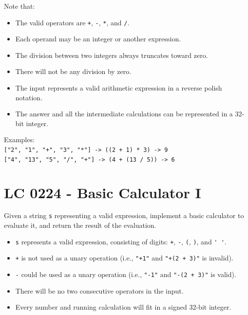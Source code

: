 Note that:
\begin{itemize}
	\item The valid operators are {\colorbox{CodeBackground}{\lstinline|+|}}, {\colorbox{CodeBackground}{\lstinline|-|}}, {\colorbox{CodeBackground}{\lstinline|*|}}, and {\colorbox{CodeBackground}{\lstinline|/|}}.
	\item Each operand may be an integer or another expression.
	\item The division between two integers always truncates toward zero.
	\item There will not be any division by zero.
	\item The input represents a valid arithmetic expression in a reverse polish notation.
	\item The answer and all the intermediate calculations can be represented in a 32-bit integer.
\end{itemize}

Examples:\\
{\colorbox{CodeBackground}{\lstinline|["2", "1", "+", "3", "*"] -> ((2 + 1) * 3) -> 9|}}\\
{\colorbox{CodeBackground}{\lstinline|["4", "13", "5", "/", "+"] -> (4 + (13 / 5)) -> 6|}}

\section{LC 0224 - Basic Calculator I}
Given a string {\colorbox{CodeBackground}{\lstinline|s|}} representing a valid expression, implement a basic calculator to evaluate it, and return the result of the evaluation.
\begin{itemize}
	\item {\colorbox{CodeBackground}{\lstinline|s|}} represents a valid expression, consisting of digits: {\colorbox{CodeBackground}{\lstinline|+|}}, {\colorbox{CodeBackground}{\lstinline|-|}}, {\colorbox{CodeBackground}{\lstinline|(|}}, {\colorbox{CodeBackground}{\lstinline|)|}}, and {\colorbox{CodeBackground}{\lstinline|' '|}}.
	\item {\colorbox{CodeBackground}{\lstinline|+|}} is not used as a unary operation (i.e., {\colorbox{CodeBackground}{\lstinline|"+1"|}} and {\colorbox{CodeBackground}{\lstinline|"+(2 + 3)"|}} is invalid).
	\item {\colorbox{CodeBackground}{\lstinline|-|}} could be used as a unary operation (i.e., {\colorbox{CodeBackground}{\lstinline|"-1"|}} and {\colorbox{CodeBackground}{\lstinline|"-(2 + 3)"|}} is valid).
	\item There will be no two consecutive operators in the input.
	\item Every number and running calculation will fit in a signed 32-bit integer.
\end{itemize}

